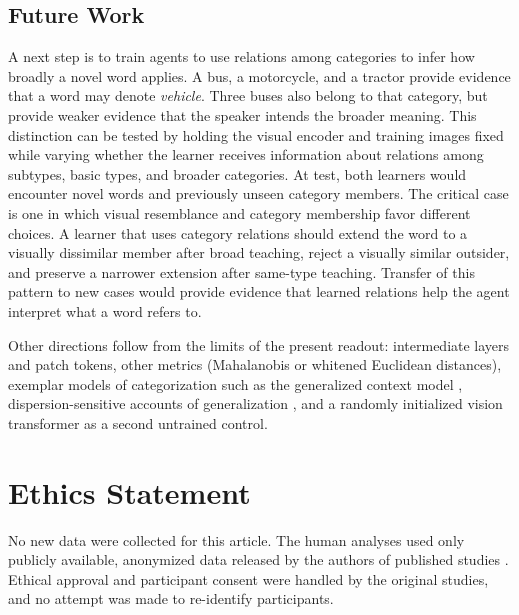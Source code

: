 \documentclass[11pt]{article}
\begin{document}
\subsection{Future Work}

A next step is to train agents to use relations among categories to infer how broadly a novel word applies. A bus, a motorcycle, and a tractor provide evidence that a word may denote \emph{vehicle}. Three buses also belong to that category, but provide weaker evidence that the speaker intends the broader meaning. This distinction can be tested by holding the visual encoder and training images fixed while varying whether the learner receives information about relations among subtypes, basic types, and broader categories. At test, both learners would encounter novel words and previously unseen category members. The critical case is one in which visual resemblance and category membership favor different choices. A learner that uses category relations should extend the word to a visually dissimilar member after broad teaching, reject a visually similar outsider, and preserve a narrower extension after same-type teaching. Transfer of this pattern to new cases would provide evidence that learned relations help the agent interpret what a word refers to.

Other directions follow from the limits of the present readout: intermediate layers and patch tokens, other metrics (Mahalanobis or whitened Euclidean distances), exemplar models of categorization such as the generalized context model \parencite{nosofsky1986}, dispersion-sensitive accounts of generalization \parencite{tenenbaum2001}, and a randomly initialized vision transformer as a second untrained control.

\section{Ethics Statement}

No new data were collected for this article. The human analyses used only publicly available, anonymized data released by the authors of published studies \parencite{lewis2018,hebart2023,roads2021,peterson2019,scott2019}. Ethical approval and participant consent were handled by the original studies, and no attempt was made to re-identify participants.
\end{document}
